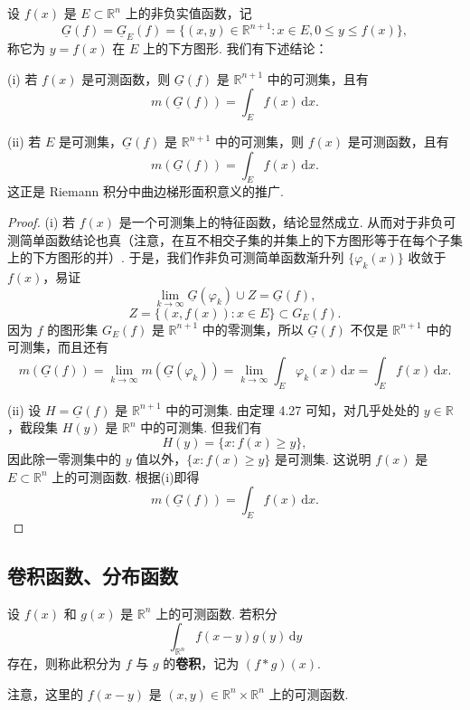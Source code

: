 \documentclass[../../main.tex]{subfiles}
\begin{document}
\begin{theorem}[积分的几何意义]\label{theorem:积分的几何意义}
设 \( f(x) \) 是 \( E \subset \mathbb{R}^n \) 上的非负实值函数，记
\[
\underline{G}(f) = \underline{G}_E(f) = \{ (x, y) \in \mathbb{R}^{n + 1} : x \in E, 0 \leqslant y \leqslant f(x) \},
\]
称它为 \( y = f(x) \) 在 \( E \) 上的下方图形. 我们有下述结论：

(i) 若 \( f(x) \) 是可测函数，则 \( \underline{G}(f) \) 是 \( \mathbb{R}^{n + 1} \) 中的可测集，且有
\[
m(\underline{G}(f)) = \int_E f(x) \, \mathrm{d}x.
\]

(ii) 若 \( E \) 是可测集，\( \underline{G}(f) \) 是 \( \mathbb{R}^{n + 1} \) 中的可测集，则 \( f(x) \) 是可测函数，且有
\[
m(\underline{G}(f)) = \int_E f(x) \, \mathrm{d}x.
\]
这正是 Riemann 积分中曲边梯形面积意义的推广.
\end{theorem}
\begin{proof}
(i) 若 \( f(x) \) 是一个可测集上的特征函数，结论显然成立. 从而对于非负可测简单函数结论也真（注意，在互不相交子集的并集上的下方图形等于在每个子集上的下方图形的并）. 于是，我们作非负可测简单函数渐升列 \( \{ \varphi_k(x) \} \) 收敛于 \( f(x) \)，易证
\[
\lim_{k \to \infty} \underline{G}(\varphi_k) \cup Z = \underline{G}(f),
\]
\[
Z = \{ (x, f(x)) : x \in E \} \subset G_E(f).
\]
因为 \( f \) 的图形集 \( G_E(f) \) 是 \( \mathbb{R}^{n + 1} \) 中的零测集，所以 \( \underline{G}(f) \) 不仅是 \( \mathbb{R}^{n + 1} \) 中的可测集，而且还有
\[
m(\underline{G}(f)) = \lim_{k \to \infty} m(\underline{G}(\varphi_k)) = \lim_{k \to \infty} \int_E \varphi_k(x) \, \mathrm{d}x = \int_E f(x) \, \mathrm{d}x.
\]

(ii) 设 \( H = \underline{G}(f) \) 是 \( \mathbb{R}^{n + 1} \) 中的可测集. 由定理 4.27 可知，对几乎处处的 \( y \in \mathbb{R} \)，截段集 \( H(y) \) 是 \( \mathbb{R}^n \) 中的可测集. 但我们有
\[
H(y) = \{ x : f(x) \geqslant y \},
\]
因此除一零测集中的 \( y \) 值以外，\( \{ x : f(x) \geqslant y \} \) 是可测集. 这说明 \( f(x) \) 是 \( E \subset \mathbb{R}^n \) 上的可测函数. 根据(i)即得
\[
m(\underline{G}(f)) = \int_E f(x) \, \mathrm{d}x.
\]

\end{proof}



\subsection{卷积函数、分布函数}

\begin{definition}[卷积]
设 \( f(x) \) 和 \( g(x) \) 是 \( \mathbb{R}^n \) 上的可测函数. 若积分
\[
\int_{\mathbb{R}^n} f(x - y) g(y) \, \mathrm{d}y
\]
存在，则称此积分为 \( f \) 与 \( g \) 的\textbf{卷积}，记为 \( (f * g)(x) \).
\end{definition}
\begin{remark}
注意，这里的 \( f(x - y) \) 是 \( (x, y) \in \mathbb{R}^n \times \mathbb{R}^n \) 上的可测函数.
\end{remark}
\end{document}

